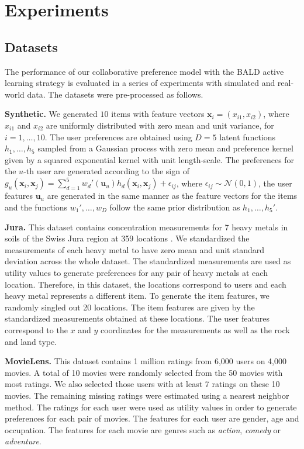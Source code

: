 \section{Experiments}\label{sec:experiments}

\subsection{Datasets}

The performance of our collaborative preference model with the BALD active learning strategy
is evaluated in a series of experiments with simulated and real-world data. The datasets were 
pre-processed as follows.

{\bf Synthetic.} We generated $10$ items with feature vectors $\mathbf{x}_i=(x_{i1},x_{i2})$,
where $x_{i1}$ and $x_{i2}$ are uniformly distributed with zero mean and unit variance, for $i = 1,\ldots,10$.
The user preferences are obtained
using $D=5$ latent functions $h_1,\ldots,h_5$ sampled from a Gaussian process
with zero mean and preference kernel given by a squared exponential kernel with unit length-scale.
The preferences for the $u$-th user are generated according to the sign of
$g_u(\mathbf{x}_i, \mathbf{x}_j) = \sum_{d=1}^5 w_{d}'(\mathbf{u}_u) h_d(\mathbf{x}_i, \mathbf{x}_j) + \epsilon_{ij}$,
where $\epsilon_{ij} \sim \mathcal{N}(0,1)$, the user features $\mathbf{u}_u$ are
generated in the same manner as the feature vectors for the items and the functions $w_{1}',\ldots,w_{D}$
follow the same prior distribution as $h_1,\ldots,h_5'$.

{\bf Jura.} 
This dataset contains concentration measurements for 7 heavy metals in soils of the Swiss Jura region at 359 locations \citep{Atteia1994315,Webster1994}.
We standardized the measurements of each heavy metal to have zero mean and unit standard deviation across the whole dataset.
The standardized measurements are used as utility values to generate preferences for any pair of heavy
metals at each location. Therefore, in this dataset, the locations correspond to users and each heavy metal
represents a different item. To generate the item features, we randomly singled out 20 locations.
The item features are given by the standardized measurements obtained at these locations. 
The user features correspond to the $x$ and $y$ coordinates for the measurements as well as the rock and land type.

{\bf MovieLens.} 
This dataset contains 1 million ratings from 6,000 users on 4,000 movies.
A total of 10 movies were randomly selected from the 50 movies with most ratings.
We also selected those users with at least 7 ratings on these 10 movies.
The remaining missing ratings were estimated using a nearest neighbor method.
The ratings for each user were used as utility values in order to generate preferences for each pair of movies.
The features for each user are gender, age and occupation. The features for each movie are genres
such as \emph{action}, \emph{comedy} or \emph{adventure}.

